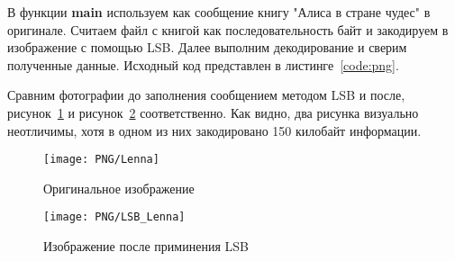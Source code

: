 В функции \textbf{main} используем как сообщение книгу "Алиса в стране чудес" в оригинале.
Считаем файл с книгой как последовательность байт и закодируем в изображение с помощью LSB.
Далее выполним декодирование и сверим полученные данные.
Исходный код представлен в листинге~\ref{code:png}.

Сравним фотографии до заполнения сообщением методом LSB и после,
рисунок~\ref{img:lenna} и рисунок~\ref{img:lenna-lsb} соответственно.
Как видно, два рисунка визуально неотличимы,
хотя в одном из них закодировано 150 килобайт информации.
\begin{figure}[ht!]
    \caption{Оригинальное изображение}
    \texttt{[image: PNG/Lenna]}
    \centering
    \label{img:lenna}
\end{figure}
\begin{figure}[ht!]
    \caption{Изображение после приминения LSB}
    \texttt{[image: PNG/LSB\_Lenna]}
    \centering
    \label{img:lenna-lsb}
\end{figure}
